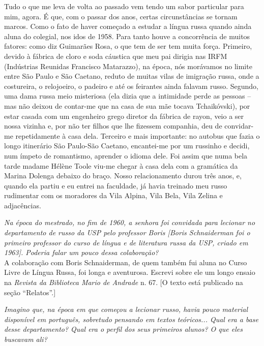 Tudo o que me leva de volta ao passado vem tendo um sabor particular
para mim, agora. É que, com o passar dos anos, certas circunstâncias se
tornam marcos. Como o fato de haver começado a estudar a língua russa
quando ainda aluna do colegial, nos idos de 1958. Para tanto houve a
concorrência de muitos fatores: como diz Guimarães Rosa, o que tem de
ser tem muita força. Primeiro, devido à fábrica de cloro e soda cáustica
que meu pai dirigia nas IRFM (Indústrias Reunidas Francisco Matarazzo),
na época, nós morávamos no limite entre São Paulo e São Caetano, reduto
de muitas vilas de imigração russa, onde a costureira, o relojoeiro, o
padeiro e até os feirantes ainda falavam russo. Segundo, uma dama russa
meio misteriosa (ela dizia que a intimidade perde as pessoas -- mas não
deixou de contar-me que na casa de sua mãe tocava Tchaikóvski), por
estar casada com um engenheiro grego diretor da fábrica de rayon, veio a
ser nossa vizinha e, por não ter filhos que lhe fizessem companhia, deu
de convidar-me repetidamente à casa dela. Terceiro e mais importante: no
autobus que fazia o longo itinerário São Paulo-São Caetano, encantei-me
por um russinho e decidi, num ímpeto de romantismo, aprender o idioma
dele. Foi assim que numa bela tarde madame Hélène Toole viu-me chegar à
casa dela com a gramática da Marina Dolenga debaixo do braço. Nosso
relacionamento durou três anos, e, quando ela partiu e eu entrei na
faculdade, já havia treinado meu russo rudimentar com os moradores da
Vila Alpina, Vila Bela, Vila Zelina e adjacências.

\emph{Na época do mestrado, no fim de 1960, a senhora foi convidada para
lecionar no departamento de russo da USP pelo professor Boris {[}Boris
Schnaiderman foi o primeiro professor do curso de língua e de literatura
russa da USP, criado em 1963{]}. Poderia falar um pouco dessa
colaboração?}\\[2\baselineskip]A colaboração com Boris Schnaiderman, de
quem também fui aluna no Curso Livre de Língua Russa, foi longa e
aventurosa. Escrevi sobre ele um longo ensaio na \emph{Revista da
Biblioteca Mario de Andrade} n. 67. {[}O texto está publicado na seção
``Relatos''.{]}

\emph{Imagino que, na época em que começou a lecionar russo, havia pouco
material disponível em português, sobretudo pensando em textos
teóricos... Qual era a base desse departamento? Qual era o perfil dos
seus primeiros alunos? O que eles buscavam ali?}

